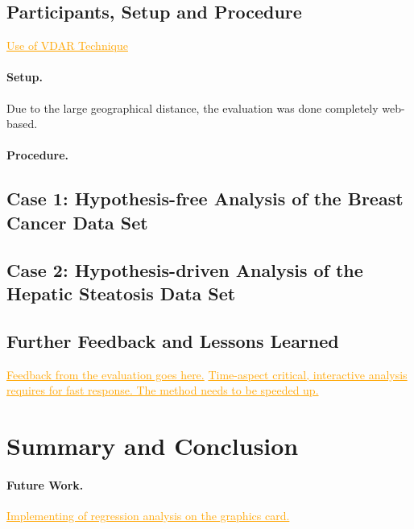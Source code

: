 \documentclass[journal]{style/vgtc} 			          %
\newcommand{\com}[1]{\textcolor{orange}{\uline{#1}}}
\begin{document}
\subsection{Participants, Setup and Procedure}
\com{Use of VDAR Technique}
%
\paragraph{Setup.} Due to the large geographical distance, the evaluation was done completely web-based.
\paragraph{Procedure.}
\subsection{Case 1: Hypothesis-free Analysis of the Breast Cancer Data Set}

\subsection{Case 2: Hypothesis-driven Analysis of the Hepatic Steatosis Data Set}
\subsection{Further Feedback and Lessons Learned} \label{Lessons Learned}
\com{Feedback from the evaluation goes here.}
\com{Time-aspect critical, interactive analysis requires for fast response. The method needs to be speeded up.}

\section{Summary and Conclusion}
\paragraph{Future Work.}
\com{Implementing of regression analysis on the graphics card.}
\begin{small}
\end{small}
\clearpage
\newpage


\end{document}
